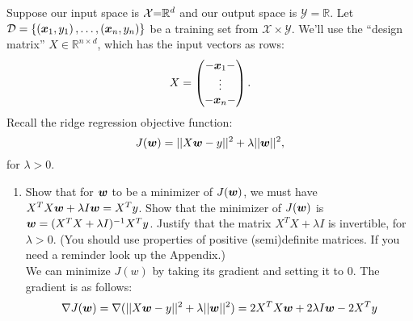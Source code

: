 \documentclass{article}
\theoremstyle{plain}
\theoremstyle{definition}
\begin{document}
Suppose our input space is $\mbox{\ensuremath{\mathcal{X}}=}\mathbb{R}^{d}$ and
our output space is $\mathcal{Y}=\mathbb{R}$. Let $\mathcal{D}=\left\{ \left(\boldsymbol{x}_{1},y_{1}\right),\ldots,\left(\boldsymbol{x}_{n},y_{n}\right)\right\} $
be a training set from $\mathcal{X}\times\mathcal{Y}$. We'll use the ``design matrix''
$X\in\mathbb{R}^{n\times d}$, which has the input vectors as rows: 
\[
X=\begin{pmatrix}-\boldsymbol{x}_{1}-\\
\vdots\\
-\boldsymbol{x}_{n}-
\end{pmatrix}.
\]
Recall the ridge regression objective function:
\[
J(\boldsymbol{w})=||X\boldsymbol{w}-y||^{2}+\lambda||\boldsymbol{w}||^{2},
\]
for $\lambda>0$.
\begin{enumerate}
  \setcounter{enumi}{\value{saveenum}}
\item Show that for $\boldsymbol{w}$ to be a minimizer of $J(\boldsymbol{w})$, we must have $X^{T}X\boldsymbol{w}+\lambda I\boldsymbol{w}=X^{T}y$.
Show that the minimizer of $J(\boldsymbol{w})$ is $\boldsymbol{w}=(X^{T}X+\lambda I)^{-1}X^{T}y$.
Justify that the matrix $X^{T}X+\lambda I$ is invertible, for $\lambda>0$.
(You should use properties of positive (semi)definite matrices. If you need a reminder look up the Appendix.) \\
\subitem
We can minimize $J(w)$ by taking its gradient and setting it to 0.
The gradient is as follows:
$$
\nabla J(\boldsymbol{w})= \nabla (||X\boldsymbol{w}-y||^{2}+\lambda||\boldsymbol{w}||^{2}) = 2X^{T}X\boldsymbol{w}+2\lambda I\boldsymbol{w} - 2X^{T}y
$$


\end{enumerate}
\end{document}
